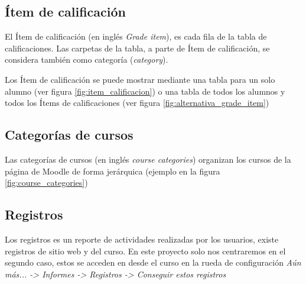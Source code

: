 \subsection{Ítem de calificación}
El Ítem de calificación\cite{noauthor_grade_nodate} (en inglés \textit{Grade item}), es cada fila de la tabla de calificaciones.
Las carpetas de la tabla, a parte de Ítem de calificación, se considera también como categoría (\textit{category}).

Los Ítem de calificación se puede mostrar mediante una tabla para un solo alumno (ver figura \ref{fig:item_calificacion}) o una tabla de todos los alumnos y todos los Ítems de calificaciones (ver figura \ref{fig:alternativa_grade_item})
	


\subsection{Categorías de cursos}
Las categorías de cursos\cite{noauthor_course_nodate-1} (en inglés \textit{course categories}) organizan los cursos de la página de Moodle de forma jerárquica (ejemplo en la figura \ref{fig:course_categories})

\subsection{Registros}
Los registros es un reporte de actividades realizadas por los usuarios, existe registros de sitio web y del curso. En este proyecto solo nos centraremos en el segundo caso, estos se acceden en desde el curso en la rueda de configuración \textit{Aún más... ->  Informes ->  Registros -> Conseguir estos registros}


